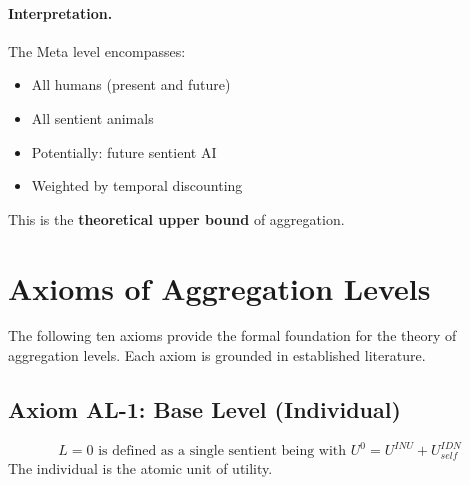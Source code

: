 \paragraph{Interpretation.}
The Meta level encompasses:
\begin{itemize}
\item All humans (present and future)
\item All sentient animals
\item Potentially: future sentient AI
\item Weighted by temporal discounting
\end{itemize}

This is the \textbf{theoretical upper bound} of aggregation.


\section{Axioms of Aggregation Levels}
\label{sec:aaa-axioms}

The following ten axioms provide the formal foundation for the theory of 
aggregation levels. Each axiom is grounded in established literature.

\subsection{Axiom AL-1: Base Level (Individual)}

\begin{tcolorbox}[colback=gray!5!white, colframe=gray!75!black, title=Axiom AL-1: Base Level]
\begin{equation}
\boxed{
L = 0 \text{ is defined as a single sentient being with } U^0 = U^{INU} + U^{IDN}_{self}
}
\end{equation}
The individual is the atomic unit of utility.
\end{tcolorbox}

